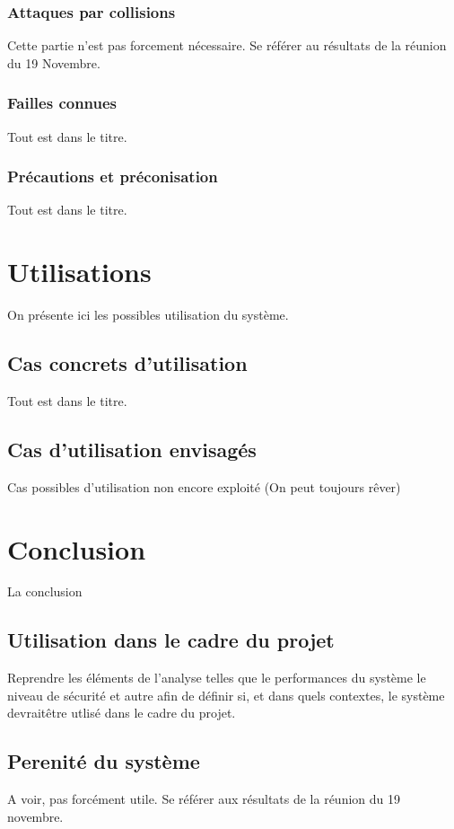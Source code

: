 \documentclass{../res/univ-projet}
\begin{document}
    \subsubsection{Attaques par collisions}
      Cette partie n'est pas forcement nécessaire. Se référer au résultats de 
la 
réunion du 19 Novembre.
    
    \subsubsection{Failles connues}
      Tout est dans le titre.
    
    \subsubsection{Précautions et préconisation}
      Tout est dans le titre.
  
\section{Utilisations}
  On présente ici les possibles utilisation du système.
  \subsection{Cas concrets d'utilisation}
    Tout est dans le titre.
  
  \subsection{Cas d'utilisation envisagés}
    Cas possibles d'utilisation non encore exploité (On peut toujours r\^ever)

\section{Conclusion}
  La conclusion
  \subsection{Utilisation dans le cadre du projet}
    Reprendre les éléments de l'analyse telles que le performances du système 
le 
niveau de sécurité et autre afin de définir si, et dans quels contextes, le 
système devrait\^etre utlisé dans le cadre du projet.
  
  \subsection{Perenité du système}
    A voir, pas forcément utile. Se référer aux résultats de la réunion du 19 
novembre.
    
\end{document}
